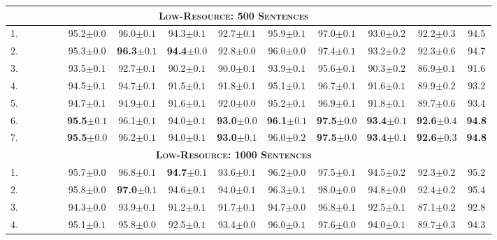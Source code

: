 \documentclass[11pt,a4paper]{article}
\newcommand{\cmark}{\textcolor{blue}{\ding{51}}}
\newcommand{\xmark}{\textcolor{red}{\ding{55}}}
\begin{document}
\begin{table*}[ht]
\begin{tabular}{l|cccc||cccccccc|c}
\hline\hline
\multicolumn{13}{c}{\bf \textsc{Low-Resource: 500 Sentences}}\\
\hline
1. & \xmark & \cmark & \xmark & \xmark & 95.2$\pm0.0$ & 96.0$\pm0.1$ & 94.3$\pm0.1$ & 92.7$\pm0.1$ & 95.9$\pm0.1$ & 97.0$\pm0.1$ & 93.0$\pm0.2$ & 92.2$\pm0.3$ & 94.5 \\
2. & \xmark & \cmark & \cmark & \xmark & 95.3$\pm0.0$ & \textbf{96.3}$\pm0.1$ & \textbf{94.4}$\pm0.0$ & 92.8$\pm0.0$ & 96.0$\pm0.0$ & 97.4$\pm0.1$ & 93.2$\pm0.2$ & 92.3$\pm0.6$ & 94.7 \\
3. & \cmark & \xmark & \xmark & \xmark & 93.5$\pm0.1$ & 92.7$\pm0.1$ & 90.2$\pm0.1$ & 90.0$\pm0.1$ & 93.9$\pm0.1$ & 95.6$\pm0.1$ & 90.3$\pm0.2$ & 86.9$\pm0.1$ & 91.6 \\
4. & \cmark & \xmark & \cmark & \xmark & 94.5$\pm0.1$ & 94.7$\pm0.1$ & 91.5$\pm0.1$ & 91.8$\pm0.1$ & 95.1$\pm0.1$ & 96.7$\pm0.1$ & 91.6$\pm0.1$ & 89.9$\pm0.2$ & 93.2 \\
5. & \cmark & \xmark & \cmark & \cmark & 94.7$\pm0.1$ & 94.9$\pm0.1$ & 91.6$\pm0.1$ & 92.0$\pm0.0$ & 95.2$\pm0.1$ & 96.9$\pm0.1$ & 91.8$\pm0.1$ & 89.7$\pm0.6$ & 93.4 \\
6. & \cmark & \cmark & \cmark & \xmark & \textbf{95.5}$\pm0.1$ & 96.1$\pm0.1$ & 94.0$\pm0.1$ & \textbf{93.0}$\pm0.0$ & \textbf{96.1}$\pm0.1$ & \textbf{97.5}$\pm0.0$ & \textbf{93.4}$\pm0.1$ & \textbf{92.6}$\pm0.4$ & \textbf{94.8} \\
7. & \cmark & \cmark & \cmark & \cmark & \textbf{95.5}$\pm0.0$ & 96.2$\pm0.1$ & 94.0$\pm0.1$ & \textbf{93.0}$\pm0.1$ & 96.0$\pm0.2$ & \textbf{97.5}$\pm0.0$ & \textbf{93.4}$\pm0.1$ & \textbf{92.6}$\pm0.3$ & \textbf{94.8} \\
\hline\hline
\multicolumn{13}{c}{\bf \textsc{Low-Resource: 1000 Sentences}}\\
\hline
1. & \xmark & \cmark & \xmark & \xmark & 95.7$\pm0.0$ & 96.8$\pm0.1$ & \textbf{94.7}$\pm0.1$ & 93.6$\pm0.1$ & 96.2$\pm0.0$ & 97.5$\pm0.1$ & 94.5$\pm0.2$ & 92.3$\pm0.2$ & 95.2 \\
2. & \xmark & \cmark & \cmark & \xmark & 95.8$\pm0.0$ & \textbf{97.0}$\pm0.1$ & 94.6$\pm0.1$ & 94.0$\pm0.1$ & 96.3$\pm0.1$ & 98.0$\pm0.0$ & 94.8$\pm0.0$ & 92.4$\pm0.2$ & 95.4 \\
3. & \cmark & \xmark & \xmark & \xmark & 94.3$\pm0.0$ & 93.9$\pm0.1$ & 91.2$\pm0.1$ & 91.7$\pm0.1$ & 94.7$\pm0.0$ & 96.8$\pm0.1$ & 92.5$\pm0.1$ & 87.1$\pm0.2$ & 92.8 \\
4. & \cmark & \xmark & \cmark & \xmark & 95.1$\pm0.1$ & 95.8$\pm0.0$ & 92.5$\pm0.1$ & 93.4$\pm0.0$ & 96.0$\pm0.1$ & 97.6$\pm0.0$ & 94.0$\pm0.1$ & 89.7$\pm0.3$ & 94.3 \\

\end{tabular}
\end{table*}
\end{document}
